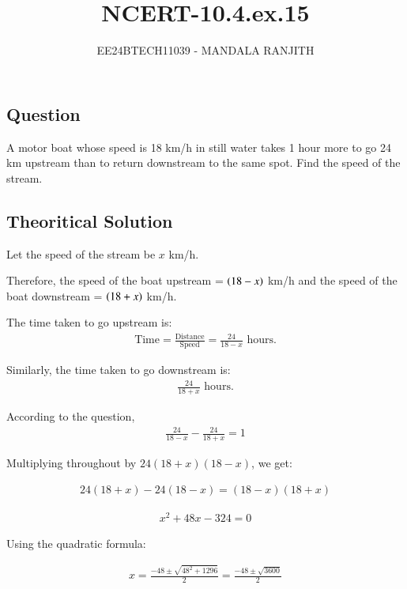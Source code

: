 \documentclass[article]{IEEEtran}
\numberwithin{figure}{enumi}
\begin{document}

\title{NCERT-10.4.ex.15}
\author{EE24BTECH11039 - MANDALA RANJITH}
{\let\newpage\relax\maketitle}


\subsection*{Question}
A motor boat whose speed is 18 km/h in still water takes 1 hour more to go 24 km upstream than to return downstream to the same spot. Find the speed of the stream.

\subsection*{Theoritical Solution}

Let the speed of the stream be  $x$  km/h.

Therefore, the speed of the boat upstream = $ \left(18 - x\right)$ km/h and the speed of the boat downstream = $\left(18 + x\right)$ km/h.

The time taken to go upstream is:
\begin{align}
\text{Time} = \frac{\text{Distance}}{\text{Speed}} = \frac{24}{18 - x} \text{ hours.}
\end{align}

Similarly, the time taken to go downstream is:
\begin{align}
\frac{24}{18 + x} \text{ hours.}
\end{align}

According to the question,
\begin{align}
\frac{24}{18 - x} - \frac{24}{18 + x} = 1
\end{align}

Multiplying throughout by \( 24(18 + x)(18 - x) \), we get:

\begin{align}
24(18 + x) - 24(18 - x) = (18 - x)(18 + x)
\end{align}

\begin{align}
x^2 + 48x - 324 = 0
\end{align}

Using the quadratic formula:

\begin{align}
x = \frac{-48 \pm \sqrt{48^2 + 1296}}{2} = \frac{-48 \pm \sqrt{3600}}{2}
\end{align}
\end{document}
